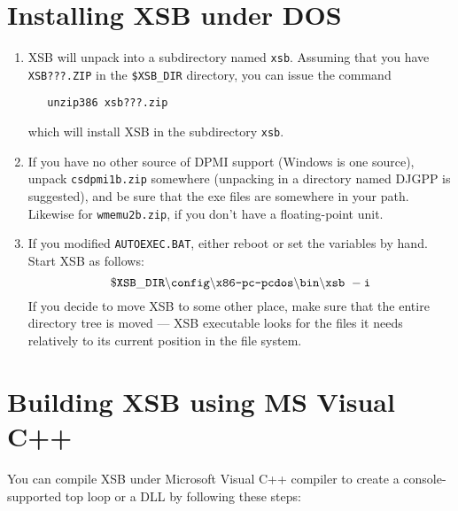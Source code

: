 \section{Installing XSB under DOS} \label{quick:DOS}

\begin{enumerate}
\item 
   XSB will unpack into a subdirectory named {\tt xsb}.
   Assuming that you have {\tt XSB???.ZIP} in the {\tt \$XSB\_DIR} directory,
   you can issue the command
\begin{verbatim}
   unzip386 xsb???.zip
\end{verbatim}
   which will install XSB in the subdirectory {\tt xsb}.

\item 
   If you have no other source of DPMI support (Windows is one source),
   unpack {\tt csdpmi1b.zip} somewhere (unpacking in a directory named
   DJGPP is suggested), and be sure that the exe files are somewhere
   in your path.  Likewise for {\tt wmemu2b.zip}, if you don't have a
   floating-point unit.

\item 
   If you modified {\tt AUTOEXEC.BAT}, either reboot or set the variables
   by hand.  Start XSB as follows:
\[
  \tt
   \$XSB\_DIR \backslash config\backslash \mbox{\tt
   x86-pc-pcdos}\backslash bin \backslash xsb~-i
\]
If you decide to move XSB to some other place, make sure that the entire
   directory tree is moved --- XSB executable looks for the files it needs
   relatively to its current position in the file system.

\end{enumerate}


\section{Building XSB using MS Visual C++}

You can compile XSB under Microsoft Visual C++ compiler 
to create a console-supported top loop or a DLL by following
these steps:

